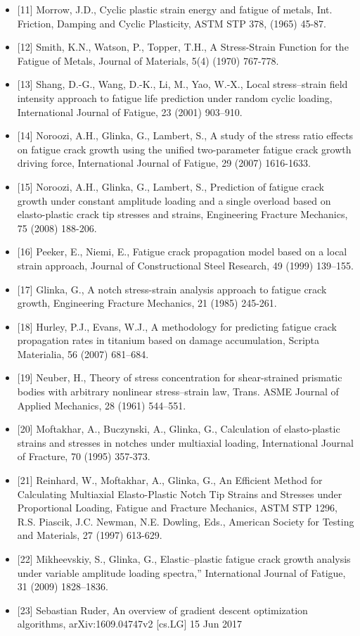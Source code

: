 \documentclass[11pt]{article}
\begin{document}
\begin{itemize}
\item
  {[}11{]} Morrow, J.D., Cyclic plastic strain energy and fatigue of
  metals, Int. Friction, Damping and Cyclic Plasticity, ASTM STP 378,
  (1965) 45-87.
\item
  {[}12{]} Smith, K.N., Watson, P., Topper, T.H., A Stress-Strain
  Function for the Fatigue of Metals, Journal of Materials, 5(4) (1970)
  767-778.
\item
  {[}13{]} Shang, D.-G., Wang, D.-K., Li, M., Yao, W.-X., Local
  stress--strain field intensity approach to fatigue life prediction
  under random cyclic loading, International Journal of Fatigue, 23
  (2001) 903--910.
\item
  {[}14{]} Noroozi, A.H., Glinka, G., Lambert, S., A study of the stress
  ratio effects on fatigue crack growth using the unified two-parameter
  fatigue crack growth driving force, International Journal of Fatigue,
  29 (2007) 1616-1633.
\item
  {[}15{]} Noroozi, A.H., Glinka, G., Lambert, S., Prediction of fatigue
  crack growth under constant amplitude loading and a single overload
  based on elasto-plastic crack tip stresses and strains, Engineering
  Fracture Mechanics, 75 (2008) 188-206.
\item
  {[}16{]} Peeker, E., Niemi, E., Fatigue crack propagation model based
  on a local strain approach, Journal of Constructional Steel Research,
  49 (1999) 139--155.
\item
  {[}17{]} Glinka, G., A notch stress-strain analysis approach to
  fatigue crack growth, Engineering Fracture Mechanics, 21 (1985)
  245-261.
\item
  {[}18{]} Hurley, P.J., Evans, W.J., A methodology for predicting
  fatigue crack propagation rates in titanium based on damage
  accumulation, Scripta Materialia, 56 (2007) 681--684.
\item
  {[}19{]} Neuber, H., Theory of stress concentration for shear-strained
  prismatic bodies with arbitrary nonlinear stress--strain law, Trans.
  ASME Journal of Applied Mechanics, 28 (1961) 544--551.
\item
  {[}20{]} Moftakhar, A., Buczynski, A., Glinka, G., Calculation of
  elasto-plastic strains and stresses in notches under multiaxial
  loading, International Journal of Fracture, 70 (1995) 357-373.
\item
  {[}21{]} Reinhard, W., Moftakhar, A., Glinka, G., An Efficient Method
  for Calculating Multiaxial Elasto-Plastic Notch Tip Strains and
  Stresses under Proportional Loading, Fatigue and Fracture Mechanics,
  ASTM STP 1296, R.S. Piascik, J.C. Newman, N.E. Dowling, Eds., American
  Society for Testing and Materials, 27 (1997) 613-629.
\item
  {[}22{]} Mikheevskiy, S., Glinka, G., Elastic--plastic fatigue crack
  growth analysis under variable amplitude loading spectra,''
  International Journal of Fatigue, 31 (2009) 1828--1836.
\item
  {[}23{]} Sebastian Ruder, An overview of gradient descent optimization
  algorithms, arXiv:1609.04747v2 {[}cs.LG{]} 15 Jun 2017
\end{itemize}


    
    
    
\end{document}
